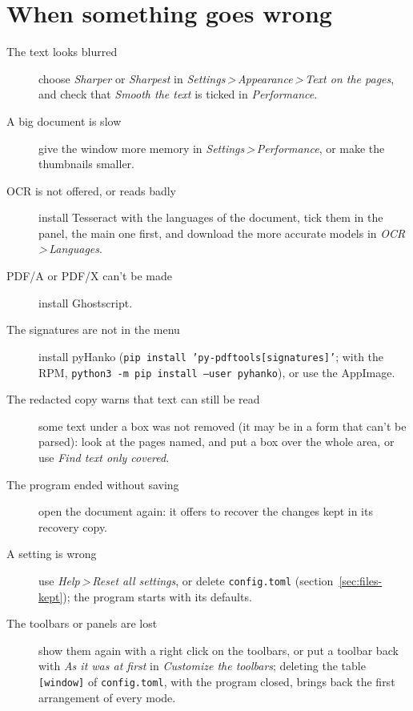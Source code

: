 \documentclass[12pt,
              article,
              oneside
              ]{memoir}
\newcommand*{\menu}[1]{\textit{#1}}
\newcommand*{\then}{\,>\,}
\begin{document}
\section{When something goes wrong}

%
\begin{description}
\item[The text looks blurred] choose \menu{Sharper} or \menu{Sharpest} in
  \menu{Settings\then Appearance\then Text on the pages}, and check that
  \menu{Smooth the text} is ticked in \menu{Performance}.
\item[A big document is slow] give the window more memory in
  \menu{Settings\then Performance}, or make the thumbnails smaller.
\item[OCR is not offered, or reads badly] install Tesseract with the
  languages of the document, tick them in the panel, the main one first,
  and download the more accurate models in \menu{OCR\then Languages}.
\item[PDF/A or PDF/X can't be made] install Ghostscript.
\item[The signatures are not in the menu] install pyHanko
  (\texttt{pip install 'py-pdftools[signatures]'}; with the RPM,
  \texttt{python3 -m pip install --user pyhanko}), or use the AppImage.
\item[The redacted copy warns that text can still be read] some text under
  a box was not removed (it may be in a form that can't be parsed): look at
  the pages named, and put a box over the whole area, or use \menu{Find
  text only covered}.
\item[The program ended without saving] open the document again: it
  offers to recover the changes kept in its recovery copy.
\item[A setting is wrong] use \menu{Help\then Reset all settings}, or
  delete \texttt{config.toml} (section~\ref{sec:files-kept}); the program
  starts with its defaults.
\item[The toolbars or panels are lost] show them again with a right click
  on the toolbars, or put a toolbar back with \menu{As it was at first} in
  \menu{Customize the toolbars}; deleting the table \texttt{[window]} of
  \texttt{config.toml}, with the program closed, brings back the first
  arrangement of every mode.
\end{description}
\end{document}
